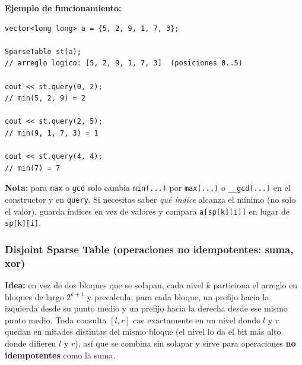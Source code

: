 \documentclass[10pt,a4paper,twocolumn]{article}
\begin{document}
\textbf{Ejemplo de funcionamiento:}

\begin{lstlisting}[style=cpp]
vector<long long> a = {5, 2, 9, 1, 7, 3};

SparseTable st(a);
// arreglo logico: [5, 2, 9, 1, 7, 3]  (posiciones 0..5)

cout << st.query(0, 2);
// min(5, 2, 9) = 2

cout << st.query(2, 5);
// min(9, 1, 7, 3) = 1

cout << st.query(4, 4);
// min(7) = 7
\end{lstlisting}

\textbf{Nota:} para \texttt{max} o \texttt{gcd} solo cambia
\texttt{min(...)} por \texttt{max(...)} o \texttt{\_\_gcd(...)} en el
constructor y en \texttt{query}. Si necesitas saber \emph{qué índice}
alcanza el mínimo (no solo el valor), guarda índices en vez de
valores y compara \texttt{a[sp[k][i]]} en lugar de \texttt{sp[k][i]}.


\subsubsection{Disjoint Sparse Table (operaciones no idempotentes: suma, xor)}

\textbf{Idea:} en vez de dos bloques que se solapan, cada nivel $k$
particiona el arreglo en bloques de largo $2^{k+1}$ y precalcula, para
cada bloque, un prefijo hacia la izquierda desde su punto medio y un
prefijo hacia la derecha desde ese mismo punto medio. Toda consulta
$[l,r]$ cae exactamente en un nivel donde $l$ y $r$ quedan en mitades
distintas del mismo bloque (el nivel lo da el bit más alto donde
difieren $l$ y $r$), así que se combina sin solapar y sirve para
operaciones \textbf{no idempotentes} como la suma.
\end{document}
